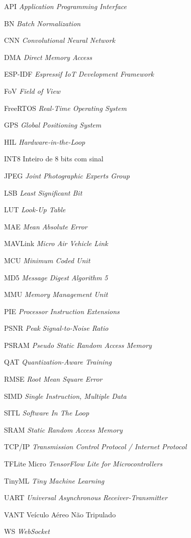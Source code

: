 \documentclass[
    12pt,
    openright,
    oneside,
    a4paper,
    chapter=TITLE,
    section=TITLE,
    english,
    brazil
]{abntex2}
\begin{document}
\begin{siglas}
    \item[API] \textit{Application Programming Interface}
    \item[BN] \textit{Batch Normalization}
    \item[CNN] \textit{Convolutional Neural Network}
    \item[DMA] \textit{Direct Memory Access}
    \item[ESP-IDF] \textit{Espressif IoT Development Framework}
    \item[FoV] \textit{Field of View}
    \item[FreeRTOS] \textit{Real-Time Operating System}
    \item[GPS] \textit{Global Positioning System}
    \item[HIL] \textit{Hardware-in-the-Loop}
    \item[INT8] Inteiro de 8 bits com sinal
    \item[JPEG] \textit{Joint Photographic Experts Group}
    \item[LSB] \textit{Least Significant Bit}
    \item[LUT] \textit{Look-Up Table}
    \item[MAE] \textit{Mean Absolute Error}
    \item[MAVLink] \textit{Micro Air Vehicle Link}
    \item[MCU] \textit{Minimum Coded Unit}
    \item[MD5] \textit{Message Digest Algorithm 5}
    \item[MMU] \textit{Memory Management Unit}
    \item[PIE] \textit{Processor Instruction Extensions}
    \item[PSNR] \textit{Peak Signal-to-Noise Ratio}
    \item[PSRAM] \textit{Pseudo Static Random Access Memory}
    \item[QAT] \textit{Quantization-Aware Training}
    \item[RMSE] \textit{Root Mean Square Error}
    \item[SIMD] \textit{Single Instruction, Multiple Data}
    \item[SITL] \textit{Software In The Loop}
    \item[SRAM] \textit{Static Random Access Memory}
    \item[TCP/IP] \textit{Transmission Control Protocol / Internet Protocol}
    \item[TFLite Micro] \textit{TensorFlow Lite for Microcontrollers}
    \item[TinyML] \textit{Tiny Machine Learning}
    \item[UART] \textit{Universal Asynchronous Receiver-Transmitter}
    \item[VANT] Veículo Aéreo Não Tripulado
    \item[WS] \textit{WebSocket}
\end{siglas}
\end{document}
